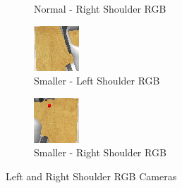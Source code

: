 \begin{figure}[htpb]
\begin{subfigure}{0.40\linewidth}
    \caption{Normal - Right Shoulder RGB}\label{subfig:normal-r-shoulder}
  \end{subfigure}
  \begin{subfigure}{0.40\linewidth}
    \centering
    \includegraphics[width=0.7\linewidth]{assets/depth-interfacing/smaller-l_rgb.png}
    \caption{Smaller - Left Shoulder RGB}\label{subfig:smaller-l-shoulder}
  \end{subfigure}
  \begin{subfigure}{0.40\linewidth}
    \centering
    \includegraphics[width=0.7\linewidth]{assets/depth-interfacing/smaller-r_rgb.png}
    \caption{Smaller - Right Shoulder RGB}\label{subfig:smaller-r-shoulder}
  \end{subfigure}
  \caption{Left and Right Shoulder RGB Cameras}\label{fig:di-lr-shoulder}
\end{figure}


